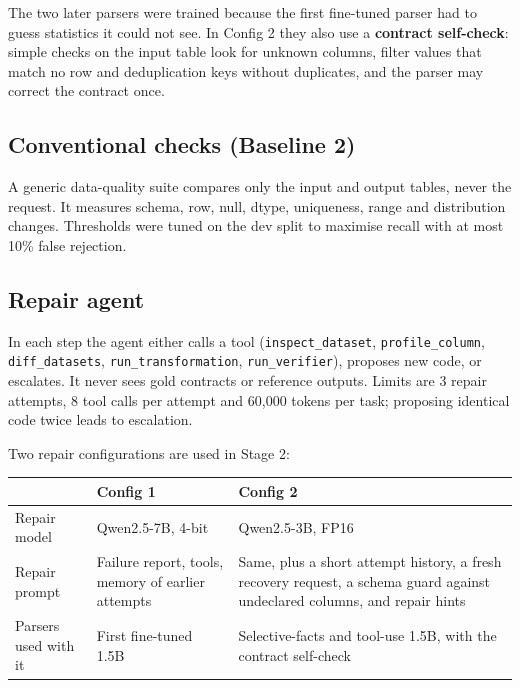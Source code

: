 \documentclass[11pt]{article}
\begin{document}
The two later parsers were trained because the first fine-tuned parser
had to guess statistics it could not see. In Config 2 they also use a
\textbf{contract self-check}: simple checks on the input table look for
unknown columns, filter values that match no row and deduplication keys
without duplicates, and the parser may correct the contract once.

\subsection{Conventional checks (Baseline 2)}

A generic data-quality suite compares only the input and output tables,
never the request. It measures schema, row, null, dtype, uniqueness,
range and distribution changes. Thresholds were tuned on the dev split
to maximise recall with at most 10\% false rejection.

\subsection{Repair agent}

In each step the agent either calls a tool
(\texttt{inspect\_\allowbreak{}dataset},
\texttt{profile\_\allowbreak{}column},
\texttt{diff\_\allowbreak{}datasets},
\texttt{run\_\allowbreak{}transformation},
\texttt{run\_\allowbreak{}verifier}), proposes new code, or escalates.
It never sees gold contracts or reference outputs. Limits are 3 repair
attempts, 8 tool calls per attempt and 60,000 tokens per task; proposing
identical code twice leads to escalation.

Two repair configurations are used in Stage 2:

\begin{table}[!tp]
\centering\footnotesize\setlength{\tabcolsep}{3pt}\renewcommand{\arraystretch}{1.1}
\begin{tabularx}{\textwidth}{l>{\raggedright\arraybackslash}X>{\raggedright\arraybackslash}X}
\toprule
\textbf{} & \textbf{Config 1} & \textbf{Config 2} \\
\midrule
Repair model & Qwen2.5-7B, 4-bit & Qwen2.5-3B, FP16 \\
Repair prompt & Failure report, tools, memory of earlier attempts & Same, plus a short attempt history, a fresh recovery request, a schema guard against undeclared columns, and repair hints \\
Parsers used with it & First fine-tuned 1.5B & Selective-facts and tool-use 1.5B, with the contract self-check \\
\bottomrule
\end{tabularx}
\end{table}
\end{document}
